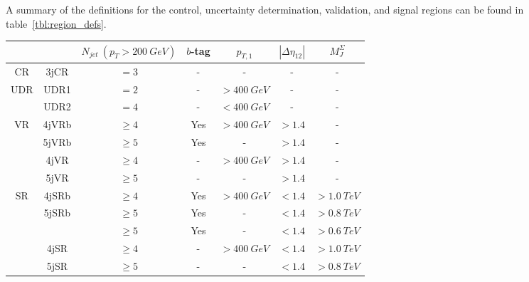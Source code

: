 A summary of the definitions for the control, uncertainty determination, validation, and signal regions can be found in table~\ref{tbl:region_defs}.

\begin{table}
    \centering

    \begin{tabular}{ccccccc}

        \toprule
                             &                        & $N_{jet}~(p_T>200~GeV)$ & $b$-tag & $p_{T,1}$  & $|\Delta\eta_{12}|$ & $M_{J}^{\Sigma}$ \\
        \midrule
        CR                   & 3jCR                   & $=3$                    & -       & -          & -                   & - \\
        \midrule
        \multirow{2}{*}{UDR} & UDR1                   & $=2$                    & -       & $>400~GeV$ & -                   & - \\
                             & UDR2                   & $=4$                    & -       & $<400~GeV$ & -                   & - \\
        \midrule
        \multirow{4}{*}{VR}  & 4jVRb                  & $\geq4$                 & Yes     & $>400~GeV$ & $>1.4$              & - \\
                             & 5jVRb                  & $\geq5$                 & Yes     & -          & $>1.4$              & - \\
                             & 4jVR                   & $\geq4$                 & -       & $>400~GeV$ & $>1.4$              & - \\
                             & 5jVR                   & $\geq5$                 & -       & -          & $>1.4$              & - \\
        \hline
        \multirow{5}{*}{SR}  & 4jSRb                  & $\geq4$                 & Yes     & $>400~GeV$ & $<1.4$              & $>1.0~TeV$ \\
                             & \multirow{2}{*}{5jSRb} & $\geq5$                 & Yes     & -          & $<1.4$              & $>0.8~TeV$ \\
                             &                        & $\geq5$                 & Yes     & -          & $<1.4$              & $>0.6~TeV$ \\
                             & 4jSR                   & $\geq4$                 & -       & $>400~GeV$ & $<1.4$              & $>1.0~TeV$ \\
                             & 5jSR                   & $\geq5$                 & -       & -          & $<1.4$              & $>0.8~TeV$ \\
        \bottomrule
    \end{tabular}


\end{table}
